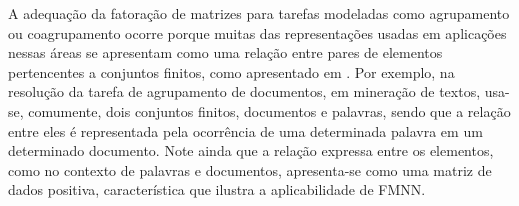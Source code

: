 \documentclass[
    12pt,                %
    oneside,            %
    a4paper,            %
    english,            %
    brazil                %
    ]{abntex2ppgsi}
\begin{document}
A adequação da fatoração de matrizes para tarefas modeladas como agrupamento ou coagrupamento ocorre porque muitas das representações usadas em aplicações nessas áreas se apresentam como uma relação entre pares de elementos pertencentes a conjuntos finitos, como apresentado em \cite{Long2005}. Por exemplo, na resolução da tarefa de agrupamento de documentos, em mineração de textos, usa-se, comumente, dois conjuntos finitos, documentos e palavras, sendo que a relação entre eles é representada pela ocorrência de uma determinada palavra em um determinado documento. Note ainda que a relação expressa entre os elementos, como no contexto de palavras e documentos, apresenta-se como uma matriz de dados positiva, característica que ilustra a aplicabilidade de FMNN.





\end{document}
